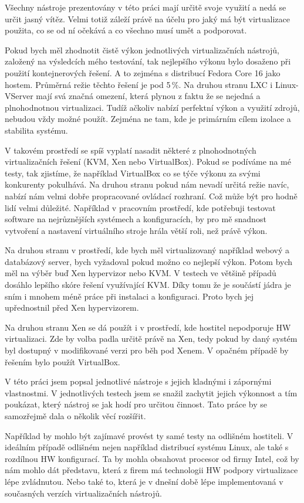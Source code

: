 Všechny nástroje prezentovány v této práci mají určitě svoje využití a nedá se určit jasný vítěz. Velmi totiž záleží právě na účelu pro jaký má být virtualizace použita, co se od ní očekává a co všechno musí umět a podporovat.

Pokud bych měl zhodnotit čistě výkon jednotlivých virtualizačních nástrojů, založený na výsledcích mého testování, tak nejlepšího výkonu bylo dosaženo při použití kontejnerových řešení. A to zejména s distribucí Fedora Core 16 jako hostem. Průměrná režie těchto řešení je pod 5\,\%. Na druhou stranu LXC i Linux-VServer mají svá značná omezení, která plynou z faktu že se nejedná a plnohodnotnou virtualizaci. Tudíž ačkoliv nabízí perfektní výkon a využití zdrojů, nebudou vždy možné použít. Zejména ne tam, kde je primárním cílem izolace a stabilita systému.

V takovém prostředí se spíš vyplatí nasadit některé z plnohodnotných virtualizačních řešení (KVM, Xen nebo VirtualBox). Pokud se podíváme na mé testy, tak zjistíme, že například VirtualBox co se týče výkonu za svými konkurenty pokulhává. Na druhou stranu pokud nám nevadí určitá režie navíc, nabízí nám velmi dobře propracované ovládací rozhraní. Což může být pro hodně lidí velmi důležité. Například v pracovním prostředí, kde potřebuji testovat software na nejrůznějších systémech a konfiguracích, by pro mě snadnost vytvoření a nastavení virtuálního stroje hrála větší roli, než právě výkon.

Na druhou stranu v prostředí, kde bych měl virtualizovaný například webový a databázový server, bych vyžadoval pokud možno co nejlepší výkon. Potom bych měl na výběr buď Xen hypervizor nebo KVM. V testech ve většině případů dosáhlo lepšího skóre řešení využívající KVM. Díky tomu že je součástí jádra je sním i mnohem méně práce při instalaci a konfiguraci. Proto bych jej upřednostnil před Xen hypervizorem.

Na druhou stranu Xen se dá použít i v prostředí, kde hostitel nepodporuje HW virtualizaci. Zde by volba padla určitě právě na Xen, tedy pokud by daný systém byl dostupný v modifikované verzi pro běh pod Xenem. V opačném případě by řešením bylo použít VirtualBox.

V této práci jsem popsal jednotlivé nástroje s jejich kladnými i zápornými vlastnostmi. V jednotlivých testech jsem se snažil zachytit jejich výkonnost a tím poukázat, který nástroj se jak hodí pro určitou činnost. Tato práce by se samozřejmě dala o několik věcí rozšířit.

Například by mohlo být zajímavé provést ty samé testy na odlišném hostiteli. V ideálním případě odlišném nejen například distribucí systému Linux, ale také s rozdílnou HW konfigurací. Ta by mohla obsahovat procesor od firmy Intel, což by nám mohlo dát představu, která z firem má technologii HW podpory virtualizace lépe zvládnutou. Nebo také to, která je v dnešní době lépe implementovaná v současných verzích virtualizačních nástrojů.

